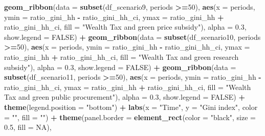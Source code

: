 \documentclass[
]{article}
\newenvironment{Shaded}{\begin{snugshade}}{\end{snugshade}}
\newcommand{\AttributeTok}[1]{\textcolor[rgb]{0.13,0.29,0.53}{#1}}
\newcommand{\ConstantTok}[1]{\textcolor[rgb]{0.56,0.35,0.01}{#1}}
\newcommand{\DecValTok}[1]{\textcolor[rgb]{0.00,0.00,0.81}{#1}}
\newcommand{\FloatTok}[1]{\textcolor[rgb]{0.00,0.00,0.81}{#1}}
\newcommand{\FunctionTok}[1]{\textcolor[rgb]{0.13,0.29,0.53}{\textbf{#1}}}
\newcommand{\NormalTok}[1]{#1}
\newcommand{\SpecialCharTok}[1]{\textcolor[rgb]{0.81,0.36,0.00}{\textbf{#1}}}
\newcommand{\StringTok}[1]{\textcolor[rgb]{0.31,0.60,0.02}{#1}}
\begin{document}
\begin{Shaded}
\begin{Highlighting}[]
  \FunctionTok{geom\_ribbon}\NormalTok{(}\AttributeTok{data =} \FunctionTok{subset}\NormalTok{(df\_scenario9, periods }\SpecialCharTok{\textgreater{}=}\DecValTok{50}\NormalTok{), }\FunctionTok{aes}\NormalTok{(}\AttributeTok{x =}\NormalTok{ periods, }\AttributeTok{ymin =}\NormalTok{ ratio\_gini\_hh }\SpecialCharTok{{-}}\NormalTok{ ratio\_gini\_hh\_ci, }\AttributeTok{ymax =}\NormalTok{ ratio\_gini\_hh }\SpecialCharTok{+}\NormalTok{ ratio\_gini\_hh\_ci, }\AttributeTok{fill =} \StringTok{"Wealth Tax and green price subsidy"}\NormalTok{), }\AttributeTok{alpha =} \FloatTok{0.3}\NormalTok{, }\AttributeTok{show.legend =} \ConstantTok{FALSE}\NormalTok{) }\SpecialCharTok{+}
  \FunctionTok{geom\_ribbon}\NormalTok{(}\AttributeTok{data =} \FunctionTok{subset}\NormalTok{(df\_scenario10, periods }\SpecialCharTok{\textgreater{}=}\DecValTok{50}\NormalTok{), }\FunctionTok{aes}\NormalTok{(}\AttributeTok{x =}\NormalTok{ periods, }\AttributeTok{ymin =}\NormalTok{ ratio\_gini\_hh }\SpecialCharTok{{-}}\NormalTok{ ratio\_gini\_hh\_ci, }\AttributeTok{ymax =}\NormalTok{ ratio\_gini\_hh }\SpecialCharTok{+}\NormalTok{ ratio\_gini\_hh\_ci, }\AttributeTok{fill =} \StringTok{"Wealth Tax and green research subsidy"}\NormalTok{), }\AttributeTok{alpha =} \FloatTok{0.3}\NormalTok{, }\AttributeTok{show.legend =} \ConstantTok{FALSE}\NormalTok{) }\SpecialCharTok{+}
  \FunctionTok{geom\_ribbon}\NormalTok{(}\AttributeTok{data =} \FunctionTok{subset}\NormalTok{(df\_scenario11, periods }\SpecialCharTok{\textgreater{}=}\DecValTok{50}\NormalTok{), }\FunctionTok{aes}\NormalTok{(}\AttributeTok{x =}\NormalTok{ periods, }\AttributeTok{ymin =}\NormalTok{ ratio\_gini\_hh }\SpecialCharTok{{-}}\NormalTok{ ratio\_gini\_hh\_ci, }\AttributeTok{ymax =}\NormalTok{ ratio\_gini\_hh }\SpecialCharTok{+}\NormalTok{ ratio\_gini\_hh\_ci, }\AttributeTok{fill =} \StringTok{"Wealth Tax and green public procurement"}\NormalTok{), }\AttributeTok{alpha =} \FloatTok{0.3}\NormalTok{, }\AttributeTok{show.legend =} \ConstantTok{FALSE}\NormalTok{) }\SpecialCharTok{+}
  \FunctionTok{theme}\NormalTok{(}\AttributeTok{legend.position =} \StringTok{"bottom"}\NormalTok{) }\SpecialCharTok{+}
  \FunctionTok{labs}\NormalTok{(}\AttributeTok{x =} \StringTok{"Time"}\NormalTok{, }\AttributeTok{y =} \StringTok{"Gini index"}\NormalTok{, }\AttributeTok{color =} \StringTok{""}\NormalTok{, }\AttributeTok{fill =} \StringTok{""}\NormalTok{) }\SpecialCharTok{+}
  \FunctionTok{theme}\NormalTok{(}\AttributeTok{panel.border =} \FunctionTok{element\_rect}\NormalTok{(}\AttributeTok{color =} \StringTok{"black"}\NormalTok{, }\AttributeTok{size =} \FloatTok{0.5}\NormalTok{, }\AttributeTok{fill =} \ConstantTok{NA}\NormalTok{),}

\end{Highlighting}
\end{Shaded}
\end{document}
